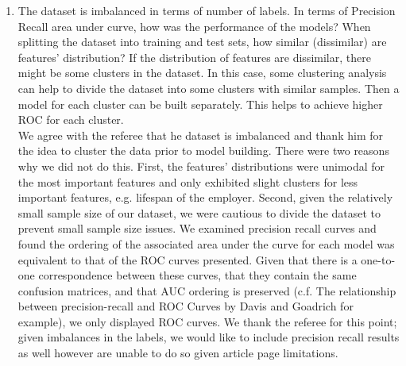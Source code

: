 \documentclass{amsart}[12pt]
\begin{document}
\begin{enumerate}
    \item   {\color{blue} 
        The dataset is imbalanced in terms of number of labels. In terms of Precision Recall area under curve, how was the performance of the models? When splitting the dataset into training and test sets, how similar (dissimilar) are features' distribution? If the distribution of features are dissimilar, there might be some clusters in the dataset. In this case, some clustering analysis can help to divide the dataset into some clusters with similar samples. Then a model for each cluster can be built separately. This helps to achieve higher ROC for each cluster.
        }\\

        We agree with the referee that he dataset is imbalanced and thank him for the idea to cluster 
        the data prior to model building.  There were two reasons why we did not do this.  First, 
        the features' distributions were unimodal for the most important features and only 
        exhibited slight clusters for less important features, e.g. lifespan of the employer.
        Second, given the relatively small sample size of our dataset, we were cautious to 
        divide the dataset to prevent small sample size issues. We examined precision recall curves 
        and found the ordering of the associated area under the curve for each model was equivalent 
        to that of the ROC curves presented. Given that there is a one-to-one correspondence
        between these curves, that they contain the same confusion matrices, and that 
        AUC ordering is preserved (c.f. The relationship between precision-recall and ROC Curves by Davis and 
        Goadrich for example), we only displayed ROC curves.  We thank the referee for this point; given 
        imbalances in the labels, we would like to include precision recall results as well however 
        are unable to do so given article page limitations. 
\end{enumerate}
\end{document}
